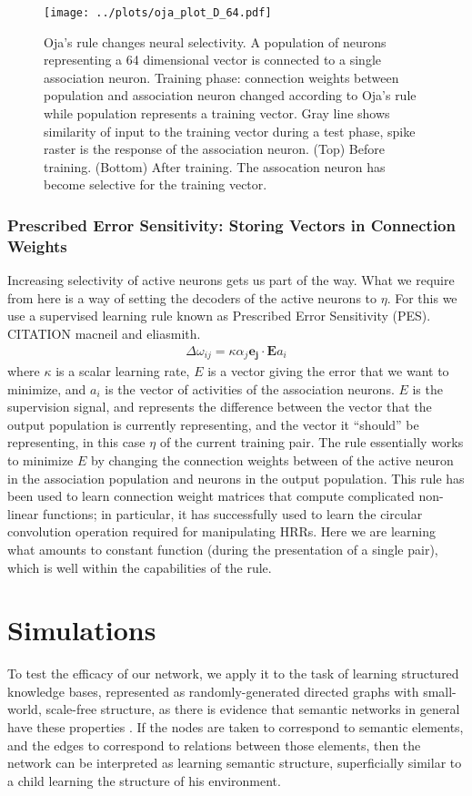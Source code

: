 \documentclass[10pt,letterpaper]{article}
\begin{document}
\begin{figure}[ht]
\begin{center}
\texttt{[image: ../plots/oja\_plot\_D\_64.pdf]}
\end{center}
\caption{Oja's rule changes neural selectivity. A population of neurons representing a 64 dimensional vector is connected to a single association neuron. Training phase: connection weights between population and association neuron changed according to Oja's rule while population represents a training vector. Gray line shows similarity of input to the training vector during a test phase, spike raster is the response of the association neuron. (Top) Before training. (Bottom) After training. The assocation neuron has become selective for the training vector.}
\label{fig:oja}
\end{figure}

\subsubsection{Prescribed Error Sensitivity: Storing Vectors in Connection Weights}
Increasing selectivity of active neurons gets us part of the way. What we require from here is a way of setting the decoders of the active neurons to $\eta$. For this we use a supervised learning rule known as Prescribed Error Sensitivity (PES). CITATION macneil and eliasmith. 
\begin{align}
\Delta \omega_{ij} = \kappa \alpha_j \mathbf{e_j} \cdot \mathbf{E}a_i
\end{align}
where $\kappa$ is a scalar learning rate, $E$ is a vector giving the error that we want to minimize, and $a_i$ is the vector of activities of the association neurons. $E$ is the supervision signal, and represents the difference between the vector that the output population is currently representing, and the vector it ``should'' be representing, in this case $\eta$ of the current training pair. The rule essentially works to minimize $E$ by changing the connection weights between of the active neuron in the association population and neurons in the output population. This rule has been used to learn connection weight matrices that compute complicated non-linear functions; in particular, it has successfully used to learn the circular convolution operation required for manipulating HRRs. Here we are learning what amounts to constant function (during the presentation of a single pair), which is well within the capabilities of the rule.

\section{Simulations}
To test the efficacy of our network, we apply it to the task of learning structured knowledge bases, represented as randomly-generated directed graphs with small-world, scale-free structure, as there is evidence that semantic networks in general have these properties \citep{Tenenbaum2005}. If the nodes are taken to correspond to semantic elements, and the edges to correspond to relations between those elements, then the network can be interpreted as learning semantic structure, superficially similar to a child learning the structure of his environment.
\end{document}
